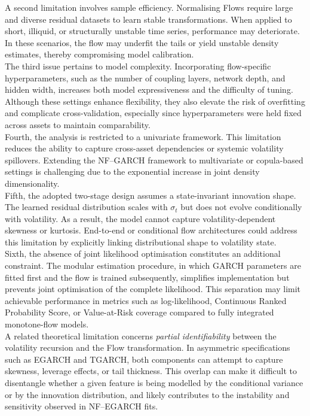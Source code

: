 \documentclass[oneside,12pt]{CUEDthesisPSnPDF}
\begin{document}
\medskip
\noindent
A second limitation involves sample efficiency. Normalising Flows require large and diverse residual datasets to learn stable transformations. When applied to short, illiquid, or structurally unstable time series, performance may deteriorate. In these scenarios, the flow may underfit the tails or yield unstable density estimates, thereby compromising model calibration.\\

\medskip
\noindent
The third issue pertains to model complexity. Incorporating flow-specific hyperparameters, such as the number of coupling layers, network depth, and hidden width, increases both model expressiveness and the difficulty of tuning. Although these settings enhance flexibility, they also elevate the risk of overfitting and complicate cross-validation, especially since hyperparameters were held fixed across assets to maintain comparability.\\

\medskip
\noindent
Fourth, the analysis is restricted to a univariate framework. This limitation reduces the ability to capture cross-asset dependencies or systemic volatility spillovers. Extending the NF–GARCH framework to multivariate or copula-based settings is challenging due to the exponential increase in joint density dimensionality.\\

\medskip
\noindent
Fifth, the adopted two-stage design assumes a state-invariant innovation shape. The learned residual distribution scales with $\sigma_t$ but does not evolve conditionally with volatility. As a result, the model cannot capture volatility-dependent skewness or kurtosis. End-to-end or conditional flow architectures could address this limitation by explicitly linking distributional shape to volatility state.\\

\medskip
\noindent
Sixth, the absence of joint likelihood optimisation constitutes an additional constraint. The modular estimation procedure, in which GARCH parameters are fitted first and the flow is trained subsequently, simplifies implementation but prevents joint optimisation of the complete likelihood. This separation may limit achievable performance in metrics such as log-likelihood, Continuous Ranked Probability Score, or Value-at-Risk coverage compared to fully integrated monotone-flow models.\\

\medskip
\noindent
A related theoretical limitation concerns \emph{partial identifiability} between the volatility recursion and the Flow transformation. In asymmetric specifications such as EGARCH and TGARCH, both components can attempt to capture skewness, leverage effects, or tail thickness. This overlap can make it difficult to disentangle whether a given feature is being modelled by the conditional variance or by the innovation distribution, and likely contributes to the instability and sensitivity observed in NF–EGARCH fits.\\
\end{document}
